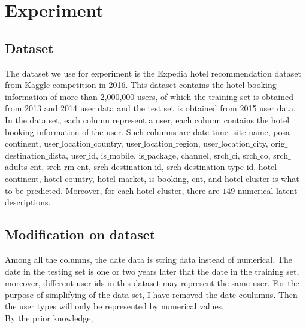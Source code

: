 \documentclass[11pt]{article} %
\begin{document}
\section{Experiment}
\subsection{Dataset}
The dataset we use for experiment is the Expedia hotel recommendation dataset from Kaggle competition in 2016. This dataset contains the hotel booking information of more than 2,000,000 users, of which the training set is obtained from 2013 and 2014 user data and the test set is obtained from 2015 user data.\\
In the data set, each column represent a user, each column contains the hotel booking information of the user. Such columns are date$\_$time. site$\_$name, posa$\_$continent, user$\_$location$\_$country, user$\_$location$\_$region, user$\_$location$\_$city, orig$\_$destination$\_$dista, user$\_$id, is$\_$mobile, is$\_$package, channel, srch$\_$ci, srch$\_$co, srch$\_$adults$\_$cnt, srch$\_$rm$\_$cnt, srch$\_$destination$\_$id, srch$\_$destination$\_$type$\_$id, hotel$\_$continent, hotel$\_$country, hotel$\_$market, is$\_$booking, cnt, and hotel$\_$cluster is what to be predicted. Moreover, for each hotel cluster, there are $149$ numerical latent descriptions.
\subsection{Modification on dataset}
Among all the columns, the date data is string data instead of numerical. The date in the testing set is one or two years later that the date in the training set, moreover, different user ids in this dataset may represent the same user. For the purpose of simplifying of the data set, I have removed the date coulumns. Then the user types will only be represented by numerical values.\\
By the prior knowledge, 
\end{document}
